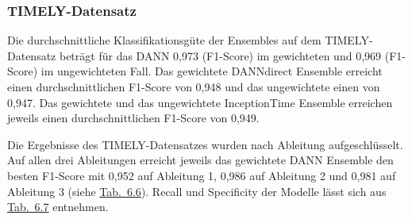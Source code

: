 \subsubsection*{TIMELY-Datensatz}

Die durchschnittliche Klassifikationsgüte der Ensembles auf dem TIMELY-Datensatz beträgt für das \gls{DANN} 0,973 (F1-Score) im gewichteten und 0,969 (F1-Score) im ungewichteten Fall. Das gewichtete DANNdirect Ensemble erreicht einen durchschnittlichen F1-Score von 0,948 und das ungewichtete einen von 0,947. Das gewichtete und das ungewichtete InceptionTime Ensemble erreichen jeweils einen durchschnittlichen F1-Score von 0,949.

Die Ergebnisse des TIMELY-Datensatzes wurden nach Ableitung aufgeschlüsselt. Auf allen drei Ableitungen erreicht jeweils das gewichtete \gls{DANN} Ensemble den besten F1-Score mit 0,952 auf Ableitung 1, 0,986 auf Ableitung 2 und 0,981 auf Ableitung 3 (siehe \hyperref[tab:Ergebnisse_timely]{Tab.~6.6}). Recall und Specificity der Modelle lässt sich aus \hyperref[tab:sens_timely]{Tab.~6.7} entnehmen.

